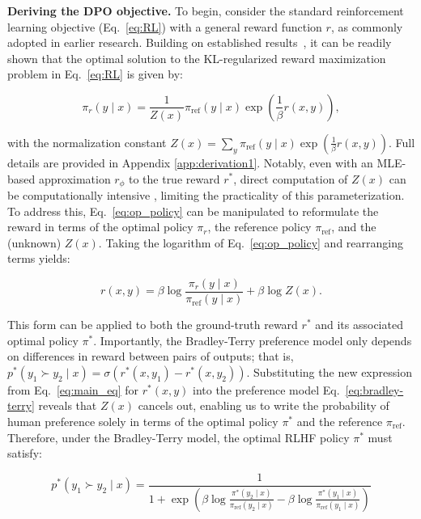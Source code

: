 \textbf{Deriving the DPO objective.} To begin, consider the standard reinforcement learning objective (Eq.~\ref{eq:RL}) with a general reward function $r$, as commonly adopted in earlier research. Building on established results~\citep{peters2007reinforcement, peng2019advantage, korbak2022reinforcement, go2023aligning}, it can be readily shown that the optimal solution to the KL-regularized reward maximization problem in Eq.~\ref{eq:RL} is given by:

\begin{equation}\label{eq:op_policy}
    \pi_r(y\mid x) = \frac{1}{Z(x)}\pi_\text{ref}(y\mid x)\exp\left(\frac{1}{\beta}r(x, y)\right),
\end{equation}

with the normalization constant $Z(x) =\sum_{y}\pi_\text{ref}(y\mid x)\exp\left(\frac{1}{\beta}r(x, y)\right)$. Full details are provided in Appendix \ref{app:derivation1}. Notably, even with an MLE-based approximation $r_{\phi}$ to the true reward $r^*$, direct computation of $Z(x)$ can be computationally intensive \citep{korbak2022reinforcement, go2023aligning}, limiting the practicality of this parameterization. To address this, Eq.~\ref{eq:op_policy} can be manipulated to reformulate the reward in terms of the optimal policy $\pi_r$, the reference policy $\pi_\text{ref}$, and the (unknown) $Z(x)$. Taking the logarithm of Eq.~\ref{eq:op_policy} and rearranging terms yields:

\begin{equation}\label{eq:main_eq}
    r(x,y) =\beta \log \frac{\pi_r(y\mid x)}{\pi_\text{ref}(y\mid x)} + \beta \log Z(x).
\end{equation}

This form can be applied to both the ground-truth reward $r^*$ and its associated optimal policy $\pi^*$. Importantly, the Bradley-Terry preference model only depends on differences in reward between pairs of outputs; that is, ${p^*(y_1 \succ y_2 \mid x) = \sigma(r^*(x, y_1) - r^*(x, y_2))}$. Substituting the new expression from Eq.~\ref{eq:main_eq} for $r^*(x,y)$ into the preference model Eq.~\ref{eq:bradley-terry} reveals that $Z(x)$ cancels out, enabling us to write the probability of human preference solely in terms of the optimal policy $\pi^*$ and the reference $\pi_\text{ref}$. Therefore, under the Bradley-Terry model, the optimal RLHF policy $\pi^*$ must satisfy:

\begin{equation}\label{eq:objective}
    p^*(y_1\succ y_2 \mid x)=\frac{1}{1 + \exp\left(\beta \log \frac{\pi^*(y_2\mid x)}{\pi_\text{ref}(y_2\mid x)} - \beta \log \frac{\pi^*(y_1\mid x)}{\pi_\text{ref}(y_1\mid x)}\right)}
\end{equation}

